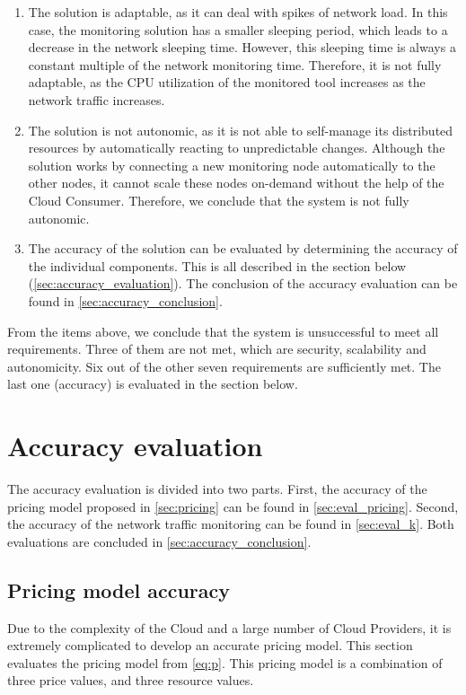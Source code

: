 \begin{enumerate}
    \item The solution is adaptable, as it can deal with spikes of network load. In this case, the monitoring solution has a smaller sleeping period, which leads to a decrease in the network sleeping time. However, this sleeping time is always a constant multiple of the network monitoring time. Therefore, it is not fully adaptable, as the CPU utilization of the monitored tool increases as the network traffic increases.
    \item The solution is not autonomic, as it is not able to self-manage its distributed resources by automatically reacting to unpredictable changes. Although the solution works by connecting a new monitoring node automatically to the other nodes, it cannot scale these nodes on-demand without the help of the Cloud Consumer. Therefore, we conclude that the system is not fully autonomic.
    \item The accuracy of the solution can be evaluated by determining the accuracy of the individual components. This is all described in the section below (\autoref{sec:accuracy_evaluation}). The conclusion of the accuracy evaluation can be found in \autoref{sec:accuracy_conclusion}.
\end{enumerate}

\noindent
From the items above, we conclude that the system is unsuccessful to meet all requirements. Three of them are not met, which are security, scalability and autonomicity. Six out of the other seven requirements are sufficiently met. The last one (accuracy) is evaluated in the section below.

\section{Accuracy evaluation} \label{sec:accuracy_evaluation}
The accuracy evaluation is divided into two parts. First, the accuracy of the pricing model proposed in \autoref{sec:pricing} can be found in \autoref{sec:eval_pricing}. Second, the accuracy of the network traffic monitoring can be found in \autoref{sec:eval_k}. Both evaluations are concluded in \autoref{sec:accuracy_conclusion}.

\subsection{Pricing model accuracy} \label{sec:eval_pricing}
Due to the complexity of the Cloud and a large number of Cloud Providers, it is extremely complicated to develop an accurate pricing model. This section evaluates the pricing model from \autoref{eq:p}. This pricing model is a combination of three price values, and three resource values.\\

